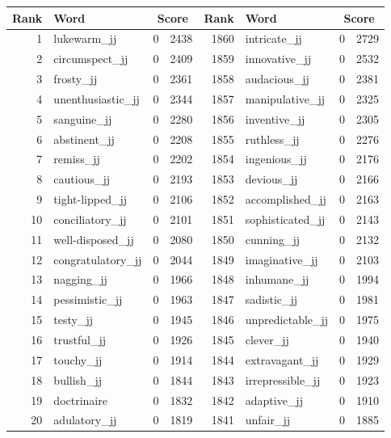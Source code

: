 \begin{table}[tbp]
    \begin{tabular}{| rlr@{.}l | rlr@{.}l |}
    \hline
    \textbf{Rank} & \textbf{Word} & \multicolumn{2}{c|}{\textbf{Score}} & \textbf{Rank} & \textbf{Word} & \multicolumn{2}{c|}{\textbf{Score}} \\
    \hline
    1 & lukewarm\_jj & 0 & 2438    &    1860 & intricate\_jj & 0 & 2729 \\
    2 & circumspect\_jj & 0 & 2409    &    1859 & innovative\_jj & 0 & 2532 \\
    3 & frosty\_jj & 0 & 2361    &    1858 & audacious\_jj & 0 & 2381 \\
    4 & unenthusiastic\_jj & 0 & 2344    &    1857 & manipulative\_jj & 0 & 2325 \\
    5 & sanguine\_jj & 0 & 2280    &    1856 & inventive\_jj & 0 & 2305 \\
    6 & abstinent\_jj & 0 & 2208    &    1855 & ruthless\_jj & 0 & 2276 \\
    7 & remiss\_jj & 0 & 2202    &    1854 & ingenious\_jj & 0 & 2176 \\
    8 & cautious\_jj & 0 & 2193    &    1853 & devious\_jj & 0 & 2166 \\
    9 & tight-lipped\_jj & 0 & 2106    &    1852 & accomplished\_jj & 0 & 2163 \\
    10 & conciliatory\_jj & 0 & 2101    &    1851 & sophisticated\_jj & 0 & 2143 \\
    11 & well-disposed\_jj & 0 & 2080    &    1850 & cunning\_jj & 0 & 2132 \\
    12 & congratulatory\_jj & 0 & 2044    &    1849 & imaginative\_jj & 0 & 2103 \\
    13 & nagging\_jj & 0 & 1966    &    1848 & inhumane\_jj & 0 & 1994 \\
    14 & pessimistic\_jj & 0 & 1963    &    1847 & sadistic\_jj & 0 & 1981 \\
    15 & testy\_jj & 0 & 1945    &    1846 & unpredictable\_jj & 0 & 1975 \\
    16 & trustful\_jj & 0 & 1926    &    1845 & clever\_jj & 0 & 1940 \\
    17 & touchy\_jj & 0 & 1914    &    1844 & extravagant\_jj & 0 & 1929 \\
    18 & bullish\_jj & 0 & 1844    &    1843 & irrepressible\_jj & 0 & 1923 \\
    19 & doctrinaire & 0 & 1832    &    1842 & adaptive\_jj & 0 & 1910 \\
    20 & adulatory\_jj & 0 & 1819    &    1841 & unfair\_jj & 0 & 1885 \\

\end{tabular}
\end{table}
